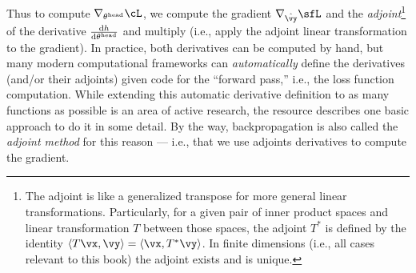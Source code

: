 \documentclass[../../book-main.tex]{subfiles}
\begin{document}
Thus to compute \(\nabla_{\theta^{\head}}\cL\), we compute the gradient \(\nabla_{\hat{\vy}}\sfL\) and the \textit{adjoint}\footnote{The adjoint is like a generalized transpose for more general linear transformations. Particularly, for a given pair of inner product spaces and linear transformation \(T\) between those spaces, the adjoint \(T^{*}\) is defined by the identity \(\ip{T\vx}{\vy} = \ip{\vx}{T^{*}\vy}\). In finite dimensions (i.e., all cases relevant to this book) the adjoint exists and is unique.} of the derivative \(\odv{h}{\theta^{\head}}\) and multiply (i.e., apply the adjoint linear transformation to the gradient). In practice, both derivatives can be computed by hand, but many modern computational frameworks can \textit{automatically} define the derivatives (and/or their adjoints) given code for the ``forward pass,'' i.e., the loss function computation. While extending this automatic derivative definition to as many functions as possible is an area of active research, the resource \cite{bright2025matrix} describes one basic approach to do it in some detail. By the way, backpropagation is also called the \textit{adjoint method} for this reason --- i.e., that we use adjoints derivatives to compute the gradient.
\end{document}

